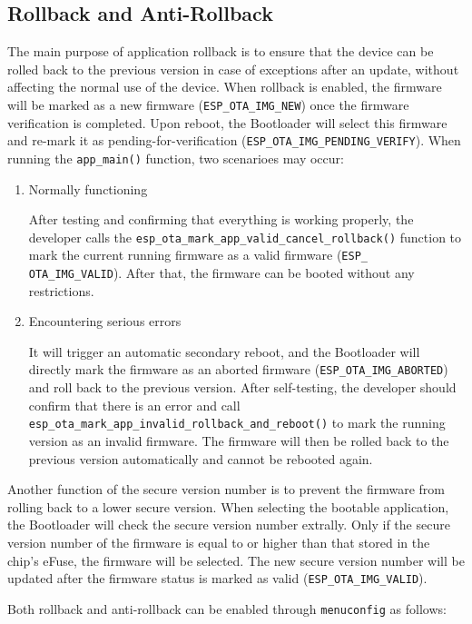 \documentclass[a4paper,12pt]{book}
\begin{document}
\subsection{Rollback and Anti-Rollback}
The main purpose of application rollback is to ensure that the device can be rolled back to the previous version in case of exceptions after an update, without affecting the normal use of the device. When rollback is enabled, the firmware will be marked as a new firmware (\verb|ESP_OTA_IMG_NEW|) once the firmware verification is completed. Upon reboot, the Bootloader will select this firmware and re-mark it as pending-for-verification (\verb|ESP_OTA_IMG_PENDING_VERIFY|). When running the \verb|app_main()| function, two scenarioes may occur:

\begin{enumerate}[label=(\arabic*)]
    \item Normally functioning
    
    After testing and confirming that everything is working properly, the developer calls the \verb|esp_ota_mark_app_valid_cancel_rollback()| function to mark the current running firmware as a valid firmware (\verb|ESP_ OTA_IMG_VALID|). After that, the firmware can be booted without any restrictions.
    \item Encountering serious errors
    
    It will trigger an automatic secondary reboot, and the Bootloader will directly mark the firmware as an aborted firmware (\verb|ESP_OTA_IMG_ABORTED|) and roll back to the previous version. After self-testing, the developer should confirm that there is an error and call \verb|esp_ota_mark_app_invalid_rollback_and_reboot()| to mark the running version as an invalid firmware. The firmware will then be rolled back to the previous version automatically and cannot be rebooted again.
\end{enumerate}

Another function of the secure version number is to prevent the firmware from rolling back to a lower secure version. When selecting the bootable application, the Bootloader will check the secure version number extrally. Only if the secure version number of the firmware is equal to or higher than that stored in the chip’s eFuse, the firmware will be selected. The new secure version number will be updated after the firmware status is marked as valid (\verb|ESP_OTA_IMG_VALID|).

Both rollback and anti-rollback can be enabled through \verb|menuconfig| as follows:
\end{document}

